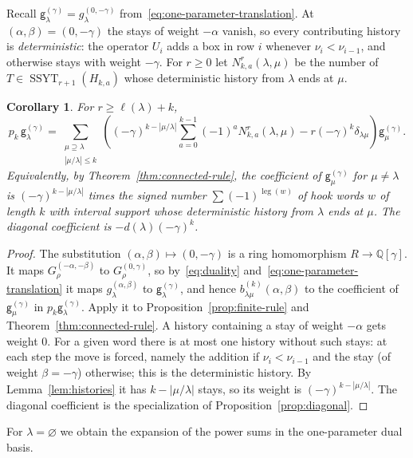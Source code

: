 \documentclass[11pt]{amsart}
\numberwithin{equation}{section}
\newtheorem{corollary}[theorem]{Corollary}
\theoremstyle{definition}
\theoremstyle{remark}
\newcommand{\SSYT}{\operatorname{SSYT}}
\newcommand{\leg}{\operatorname{leg}}
\newcommand{\one}{\varnothing}
\newcommand{\sg}{\mathsf g}
\newcommand{\QQ}{\mathbb Q}
\begin{document}
Recall $\sg^{(\gamma)}_\lambda=g^{(0,-\gamma)}_\lambda$ from~\eqref{eq:one-parameter-translation}.
At $(\alpha,\beta)=(0,-\gamma)$ the stays of weight $-\alpha$ vanish, so every
contributing history is \emph{deterministic}: the operator $U_i$ adds a box
in row $i$ whenever $\nu_i<\nu_{i-1}$, and otherwise stays with weight
$-\gamma$. For $r\geq0$ let $N^r_{k,a}(\lambda,\mu)$ be the number of
$T\in\SSYT_{r+1}(H_{k,a})$ whose deterministic history from $\lambda$ ends at
$\mu$.

\begin{corollary}\label{cor:one-param-finite}
For $r\geq\ell(\lambda)+k$, \[
 p_k\,\sg^{(\gamma)}_\lambda
 =\sum_{\substack{\mu\supseteq\lambda\\|\mu/\lambda|\leq k}}
 \left(
 (-\gamma)^{k-|\mu/\lambda|}
 \sum_{a=0}^{k-1}(-1)^aN^r_{k,a}(\lambda,\mu)
 -r(-\gamma)^k\delta_{\lambda\mu}
 \right)\sg^{(\gamma)}_\mu.
\]
Equivalently, by Theorem~\ref{thm:connected-rule}, the coefficient of
$\sg^{(\gamma)}_\mu$ for $\mu\neq\lambda$ is $(-\gamma)^{k-|\mu/\lambda|}$ times the
signed number $\sum(-1)^{\leg(w)}$ of hook words $w$ of length $k$ with
interval support whose deterministic history from $\lambda$ ends at $\mu$. The
diagonal coefficient is $-d(\lambda)(-\gamma)^k$.
\end{corollary}

\begin{proof}
The substitution $(\alpha,\beta)\mapsto(0,-\gamma)$ is a ring homomorphism
$R\to\QQ[\gamma]$. It maps $G^{(-\alpha,-\beta)}_\rho$ to $G^{(0,\gamma)}_\rho$, so
by~\eqref{eq:duality} and~\eqref{eq:one-parameter-translation} it maps
$g^{(\alpha,\beta)}_\lambda$ to $\sg^{(\gamma)}_\lambda$, and hence
$b^{(k)}_{\lambda\mu}(\alpha,\beta)$ to the coefficient of $\sg^{(\gamma)}_\mu$ in
$p_k\sg^{(\gamma)}_\lambda$. Apply it to Proposition~\ref{prop:finite-rule} and
Theorem~\ref{thm:connected-rule}. A history containing a stay of weight
$-\alpha$ gets weight $0$. For a given word there is at most one history
without such stays: at each step the move is forced, namely the addition
if $\nu_i<\nu_{i-1}$ and the stay (of weight $\beta=-\gamma$) otherwise; this
is the deterministic history. By Lemma~\ref{lem:histories} it has
$k-|\mu/\lambda|$ stays, so its weight is $(-\gamma)^{k-|\mu/\lambda|}$. The
diagonal coefficient is the specialization of
Proposition~\ref{prop:diagonal}.
\end{proof}

For $\lambda=\one$ we obtain the expansion of the power sums in the one-parameter dual basis.
\end{document}
